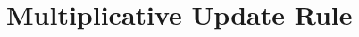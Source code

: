 \documentclass[
10pt, %
a4paper, %
oneside, %
headinclude,footinclude, %
BCOR5mm, %
]{scrartcl}
\begin{document}
%
%
%
%

%
%
%
%
%


\section{Multiplicative Update Rule}

%
\end{document}
